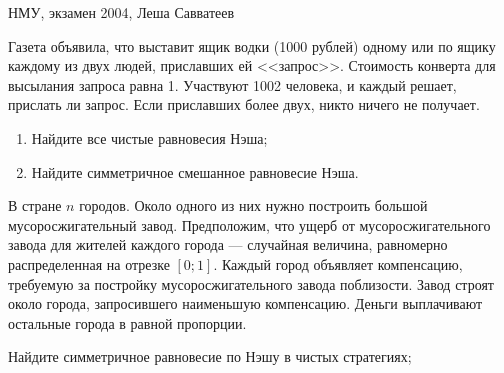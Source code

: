 \begin{problem}
\begin{source}
НМУ, экзамен 2004, Леша Савватеев
\end{source}
Газета объявила, что выставит ящик водки (1000 рублей) одному или по ящику каждому из двух людей, приславших ей <<запрос>>. Стоимость конверта для высылания запроса равна 1. Участвуют 1002 человека, и каждый решает, прислать ли запрос. Если приславших более двух, никто ничего не получает.
\begin{enumerate}
\item Найдите все чистые равновесия Нэша;
\item  Найдите симметричное смешанное равновесие Нэша.
\end{enumerate}


\begin{sol}

\end{sol}
\end{problem}


\begin{problem}\par
В стране  $n$  городов. Около одного из них нужно построить большой мусоросжигательный завод. Предположим, что ущерб от мусоросжигательного завода для жителей каждого города --- случайная величина, равномерно распределенная на отрезке  $\left[0;1\right]$. Каждый город объявляет компенсацию, требуемую за постройку мусоросжигательного завода поблизости. Завод строят около города, запросившего наименьшую компенсацию. Деньги выплачивают остальные города в равной пропорции.\par
Найдите симметричное равновесие по Нэшу в чистых стратегиях;



\begin{sol}

\end{sol}
\end{problem}


